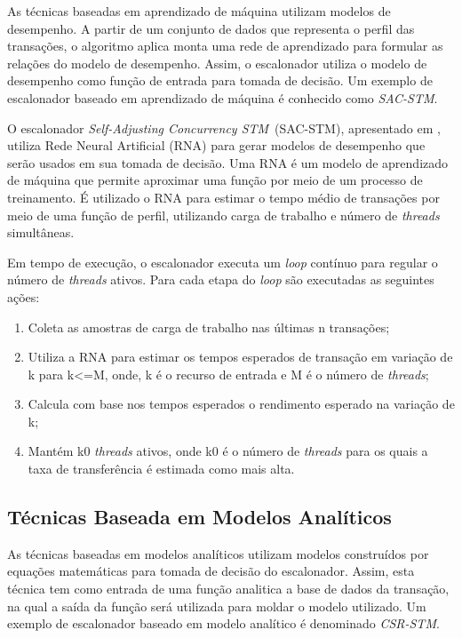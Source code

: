 \documentclass[ti]{texufpel} %
\begin{document}
As técnicas baseadas em aprendizado de máquina utilizam modelos de desempenho. A partir de um conjunto de dados que representa o perfil das transações, o algoritmo aplica monta uma rede de aprendizado para formular as relações do modelo de desempenho. Assim, o escalonador utiliza o modelo de desempenho como função de entrada para tomada de decisão. Um exemplo de escalonador baseado em aprendizado de máquina é conhecido como \emph{SAC-STM}.

O escalonador \emph{Self-Adjusting Concurrency STM}~(SAC-STM), apresentado em \cite{rughetti12}, utiliza Rede Neural Artificial (RNA) para gerar modelos de desempenho que serão usados em sua tomada de decisão. Uma RNA é um modelo de aprendizado de máquina que permite aproximar uma função por meio de um processo de treinamento. É utilizado o RNA para estimar o tempo médio de transações por meio de uma função de perfil, utilizando carga de trabalho e número de \emph{threads} simultâneas.

Em tempo de execução, o escalonador executa um \emph{loop} contínuo para regular o número de \emph{threads} ativos. Para cada etapa do \emph{loop} são executadas as seguintes ações:

\begin{enumerate}
 \item Coleta as amostras de carga de trabalho nas últimas n transações;
 \item Utiliza a RNA para estimar os tempos esperados de transação em variação de k para k<=M, onde, k é o recurso de entrada e M é o número de \emph{threads};
 \item Calcula com base nos tempos esperados o rendimento esperado na variação de k;
 \item Mantém k0 \emph{threads} ativos, onde k0 é o número de \emph{threads} para os quais a taxa de transferência é estimada como mais alta.
\end{enumerate}

\subsection{Técnicas Baseada em Modelos Analíticos}

As técnicas baseadas em modelos analíticos utilizam modelos construídos por equações matemáticas para tomada de decisão do escalonador. Assim, esta técnica tem como entrada de uma função analitica a base de dados da transação, na qual a saída da função será utilizada para moldar o modelo utilizado. Um exemplo de escalonador baseado em modelo  analítico é denominado \emph{CSR-STM}.
\end{document}
